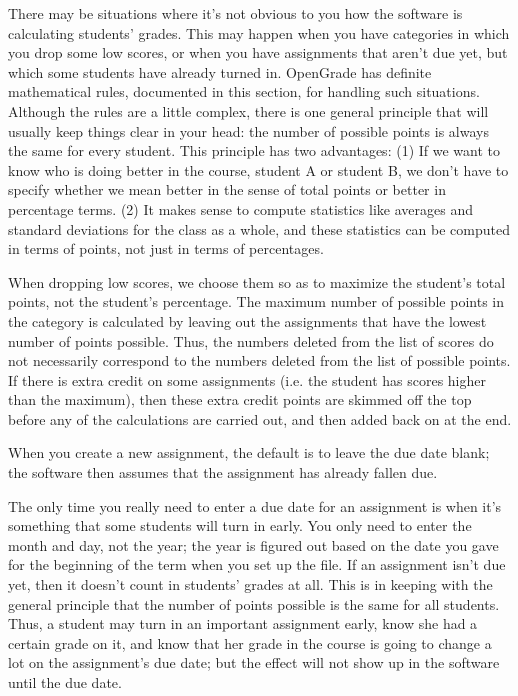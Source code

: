 \documentclass{opengrade_doc}
\begin{document}
\label{howcalc}
There may be situations where it's not obvious to you how the
software is calculating students' grades. This may happen when
you have categories in which you drop some low scores, or
when you have assignments that aren't due yet, but which some
students have already turned in. OpenGrade has definite mathematical
rules, documented in this section,
 for handling such situations. Although the rules are a little
complex, there is one general principle that will usually keep things
clear in your head: the number of possible points is always the same
for every student.
This principle has two advantages: (1) If we want to know who is
doing better in the course, student A or student B, we don't have to specify
whether we mean better in the sense of total points or better in percentage
terms. (2) It makes sense to compute statistics like averages and standard
deviations for the class as a whole, and these statistics can be computed
in terms of points, not just in terms of percentages. 

 When dropping low
scores, we choose them so as to maximize the student's total points,
not the student's percentage. The maximum number of possible points in
the category is calculated by leaving out the assignments that have the
lowest number of points possible. Thus, the numbers deleted from the
list of scores do not necessarily correspond to the numbers deleted
from the list of possible points. If there is extra credit on some
assignments (i.e. the student has scores higher than the maximum),
then these extra credit points are skimmed off the top before any
of the calculations are carried out, and then added back on at the
end.

When you create a new assignment, the default is to leave the due
date blank; the software then assumes that the assignment has already
fallen due.

The only time you really need to enter a due date for an assignment is
when it's something that some students will turn in early. You only need
to enter the month and day, not the year; the year is figured out based
on the date you gave for the beginning of the term when you set up the file.
If an assignment isn't due yet, then it doesn't count in students' grades
at all. This is in keeping with the general principle that the number of points
possible is the same for all students. Thus, a student may turn in an important
assignment early, know she had a certain grade on it, and know that her
grade in the course is going to change a lot on the assignment's due date; but
the effect will not show up in the software until the due date.
\end{document}
